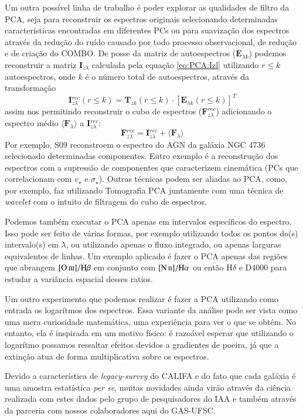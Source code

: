 Um outra possível linha de trabalho é poder explorar as qualidades de filtro da PCA, seja para reconstruir os espectros
originais selecionando determinadas características encontradas em diferentes PCs ou para suavização dos espectros
através da redução do ruído causado por todo processo observacional, de redução e de criação do COMBO. De posse da
matriz de autoespectros ($\mathbf{E}_{\lambda k}$) podemos reconstruir a matriz $\mathbf{I}_{z \lambda}$  calculada pela
equação \ref{eq:PCA:Izl} utilizando $r \leq k$ autoespectros, onde $k$ é o número total de autoespectros, através da
transformação
\begin{equation}
	\mathbf{I}{}_{z \lambda}^{rec}(r \leq k) = \mathbf{T}{}_{z k}(r \leq k) \cdot [\mathbf{E}{}_{\lambda k}(r \leq k)]^T
\end{equation}
\noindent assim nos permitindo reconstruir o cubo de espectros ($\mathbf{F}_{z \lambda}^{rec}$) adicionando o
espectro médio $\langle \mathbf{F}{}_\lambda \rangle$ a $\mathbf{I}{}_{z \lambda}^{rec}$:
\begin{equation}
	\mathbf{F}{}_{z \lambda}^{rec} = \mathbf{I}{}_{z \lambda}^{rec} + \langle \mathbf{F}{}_\lambda \rangle
\end{equation}
 \noindent Por exemplo, S09 reconstroem o espectro do AGN da galáxia NGC 4736 selecionado determinadas componentes.
 Eutro exemplo é a reconstrução dos espectros com a supressão de componentes que caracterizem cinemática (PCs que
 correlacionam com $v_\star$ e $\sigma_\star$). Outras técnicas podem ser aliadas ao PCA, como, por exemplo, faz
 \citet{Riffel2011} utilizando Tomografia PCA juntamente com uma técnica de {\em wavelet} com o intuito de filtragem do
 cubo de espectros.

Podemos também executar o PCA apenas em intervalos específicos do espectro. Isso pode ser feito de várias formas, por
exemplo utilizando todos os pontos do(s) intervalo(s) em $\lambda$, ou utilizando apenas o fluxo integrado, ou apenas
larguras equivalentes de linhas. Um exemplo aplicado é fazer o PCA apenas das regiões que abrangem $\oIII/\Hbeta$ em
conjunto com $\nII/\Halpha$ ou então $\mathrm{H}\delta$ e D4000 para estudar a variância espacial desses ratios.

Um outro experimento que podemos realizar é fazer a PCA utilizando como entrada os logarítmos dos espectros. Essa
variante da análise pode ser vista como uma mera curiosidade matemática, uma experiência para ver o que se obtém. No
entanto, ela é inspirada em um motivo físico: é razoável esperar que utilizando o logarítmo possamos ressaltar efeitos
devidos a gradientes de poeira, já que a extinção atua de forma multiplicativa sobre os espectros.

Devido a característica de {\em legacy-survey} do CALIFA e do fato que cada galáxia é uma amostra estatística
{\em per se}, muitas novidades ainda virão através da ciência realizada com estes dados pelo grupo de pesquisadores do
IAA e também através da parceria com nossos colaboradores aqui do GAS-UFSC.

